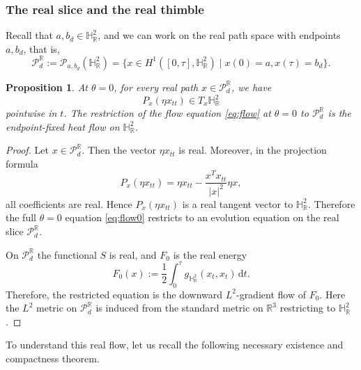 \documentclass[11pt]{amsart}
\theoremstyle{plain}
\newtheorem{prop}[thm]{Proposition}
\theoremstyle{definition}
\newcommand{\R}{\mathbb{R}}
\newcommand{\dd}{\mathrm d}
\newcommand{\PP}{\mathcal{P}}
\newcommand{\HH}{\mathbb{H}}
\newcommand{\PR}{\mathcal{P}_d^{\mathbb{R}}}
\begin{document}
\subsubsection{The real slice and the real thimble}
Recall that $a,b_d\in\HH_{\R}^2$, and we can work on the real path space with endpoints $a,b_d$, that is,
\[\PP_d^{\R}:=\PP_{a,b_d}(\HH_{\R}^2)=\{x\in H^1([0,\tau],\HH_{\R}^2)\mid x(0)=a,x(\tau)=b_d\}.\]

\begin{prop}\label{prop:real-invariant}
At $\theta=0$, for every real path $x\in \PP^{\R}_d$, we have
\[
P_x(\eta x_{tt})\in T_x \HH^2_{\R}
\]
pointwise in $t$.  The restriction of the flow equation \eqref{eq:flow} at $\theta=0$ to
$\PP^{\R}_d$ is the endpoint-fixed heat flow on
$\HH^2_{\R}$.
\end{prop}

\begin{proof}
Let $x\in \PP^{\R}_d$.  Then the vector
$\eta x_{tt}$ is real.  Moreover, in the projection formula
\[
P_x(\eta x_{tt})=\eta x_{tt}-\frac{x^T x_{tt}}{|x|^2}\eta x,
\]
all coefficients are real.  Hence $P_x(\eta x_{tt})$ is a real tangent
vector to $\HH^2_{\R}$.  Therefore the full
$\theta=0$ equation \eqref{eq:flow0} restricts to an evolution equation on the real slice
$\PP^{\R}_d$. 

On $\PR$ the functional $S$ is real, and $F_0$ is the real energy
\[
F_0(x):=\frac12\int_0^\tau g_{\HH_{\R}^2}(x_t,x_t)\,\dd t.
\]
Therefore, the restricted equation is the downward $L^2$-gradient flow of $F_0$. Here the $L^2$ metric on $\PP^{\R}_d$ is induced from the standard metric on $\R^3$ restricting to $\HH_{\R}^2$. 
\end{proof}


To understand this real flow, let us recall the following necessary existence and compactness theorem.
\end{document}

